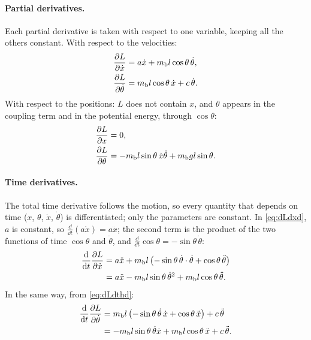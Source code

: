 \paragraph{Partial derivatives.}
Each partial derivative is taken with respect to one variable, keeping all the
others constant. With respect to the velocities:
\begin{align}
  \frac{\partial L}{\partial\dot x} &= a\dot x + m_{\mathrm b} l\cos\theta\,\dot\theta , \label{eq:dLdxd}\\
  \frac{\partial L}{\partial\dot\theta} &= m_{\mathrm b} l\cos\theta\,\dot x + c\,\dot\theta . \label{eq:dLdthd}
\end{align}
With respect to the positions: $L$ does not contain $x$, and $\theta$ appears
in the coupling term and in the potential energy, through $\cos\theta$:
\begin{align}
  \frac{\partial L}{\partial x} &= 0 , \\
  \frac{\partial L}{\partial\theta} &= -m_{\mathrm b} l\sin\theta\,\dot x\dot\theta + m_{\mathrm b} g l\sin\theta .
  \label{eq:dLdth}
\end{align}

\paragraph{Time derivatives.}
The total time derivative follows the motion, so every quantity that depends
on time ($x$, $\theta$, $\dot x$, $\dot\theta$) is differentiated; only the
parameters are constant. In \cref{eq:dLdxd}, $a$ is constant, so
$\frac{\dd}{\dd t}(a\dot x) = a\ddot x$; the second term is the product of the
two functions of time $\cos\theta$ and $\dot\theta$, and
$\frac{\dd}{\dd t}\cos\theta = -\sin\theta\,\dot\theta$:
\begin{align}
  \frac{\mathrm{d}}{\mathrm{d} t}\frac{\partial L}{\partial\dot x}
  &= a\ddot x + m_{\mathrm b} l\left(-\sin\theta\,\dot\theta\cdot\dot\theta + \cos\theta\,\ddot\theta\right) \nonumber\\
  &= a\ddot x - m_{\mathrm b} l\sin\theta\,\dot\theta^2 + m_{\mathrm b} l\cos\theta\,\ddot\theta .
\end{align}
In the same way, from \cref{eq:dLdthd}:
\begin{align}
  \frac{\mathrm{d}}{\mathrm{d} t}\frac{\partial L}{\partial\dot\theta}
  &= m_{\mathrm b} l\left(-\sin\theta\,\dot\theta\,\dot x + \cos\theta\,\ddot x\right) + c\,\ddot\theta \nonumber\\
  &= -m_{\mathrm b} l\sin\theta\,\dot\theta\dot x + m_{\mathrm b} l\cos\theta\,\ddot x + c\,\ddot\theta .
\end{align}

